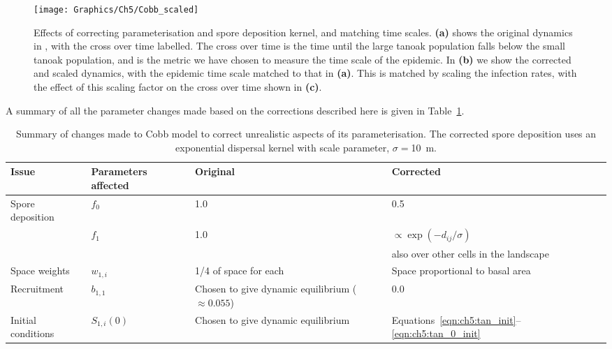 \begin{figure}[t]
    \begin{center}
        \texttt{[image: Graphics/Ch5/Cobb\_scaled]}
        \caption[Effect of model reparameterisation and infection rate scaling]{Effects of correcting parameterisation and spore deposition kernel, and matching time scales. \textbf{(a)} shows the original dynamics in \citet{cobb_ecosystem_2012}, with the cross over time labelled. The cross over time is the time until the large tanoak population falls below the small tanoak population, and is the metric we have chosen to measure the time scale of the epidemic. In \textbf{(b)} we show the corrected and scaled dynamics, with the epidemic time scale matched to that in \textbf{(a)}. This is matched by scaling the infection rates, with the effect of this scaling factor on the cross over time shown in \textbf{(c)}.\label{fig:ch5:inf_scaling}}
    \end{center}
\end{figure}

A summary of all the parameter changes made based on the corrections described here is given in Table~\ref{tab:ch5:param_changes}.

\begin{table}[h]
    \centering
    \caption[Summary of corrections to Cobb model]{Summary of changes made to Cobb model to correct unrealistic aspects of its parameterisation. The corrected spore deposition uses an exponential dispersal kernel with scale parameter, $\sigma=$\SI{10}{\meter}.\label{tab:ch5:param_changes}}
    \begin{tabular}{@{}lp{2cm}p{4cm}p{3cm}@{}}
        \toprule
        \textbf{Issue} & \textbf{Parameters affected} & \textbf{Original} & \textbf{Corrected} \\
        \midrule
        Spore deposition & $f_0$ & 1.0 & 0.5 \\
        & $f_1$ & 1.0 & $\propto \exp{\left(-d_{ij}/\sigma\right)}$ \\
        &&&{\small{}also over other cells in the landscape}\\
        \midrule
        Space weights & $w_{1,i}$ & 1/4 of space for each & Space proportional to basal area \\
        \midrule
        Recruitment & $b_{1,1}$ & Chosen to give dynamic equilibrium ($\approx{}0.055$) & 0.0 \\
        \midrule
        Initial conditions & $S_{1,i}(0)$ & Chosen to give dynamic equilibrium & Equations~\ref{eqn:ch5:tan_init}--\ref{eqn:ch5:tan_0_init} \\
        \bottomrule
    \end{tabular}
    \end{table}

